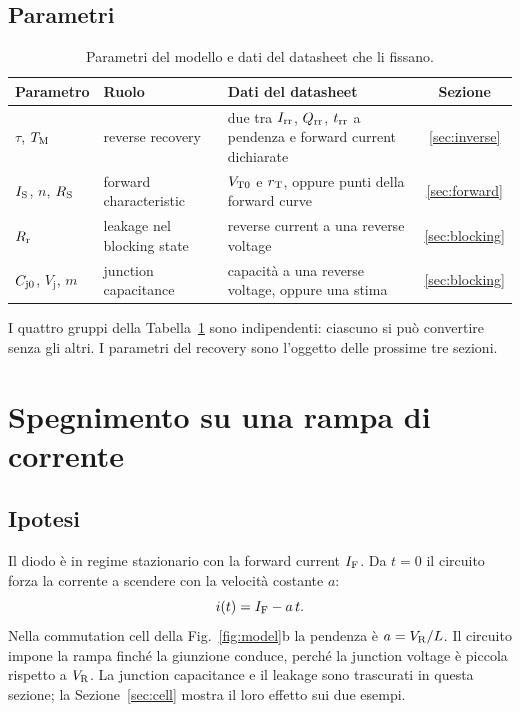 \documentclass[10pt,a4paper]{scrartcl}
\let\newcommand\lmitdefine
\newcommand{\IF}{I_\mathrm{F}}
\newcommand{\VR}{V_\mathrm{R}}
\newcommand{\Irr}{I_\mathrm{rr}}
\newcommand{\Qrr}{Q_\mathrm{rr}}
\newcommand{\trr}{t_\mathrm{rr}}
\newcommand{\TM}{T_\mathrm{M}}
\newcommand{\IS}{I_\mathrm{S}}
\newcommand{\RS}{R_\mathrm{S}}
\newcommand{\Rr}{R_\mathrm{r}}
\newcommand{\VTo}{V_\mathrm{T0}}
\newcommand{\rT}{r_\mathrm{T}}
\newcommand{\Cjo}{C_\mathrm{j0}}
\begin{document}
\subsection{Parametri}
\begin{table}[htb]
\centering\small
\caption{Parametri del modello e dati del datasheet che li fissano.}
\label{tab:params}
\begin{tabular}{@{}llp{6.4cm}c@{}}
\toprule
Parametro & Ruolo & Dati del datasheet & Sezione \\
\midrule
$\tau$, $\TM$ & reverse recovery & due tra $\Irr$, $\Qrr$, $\trr$ a pendenza e forward current dichiarate & \ref{sec:inverse} \\
$\IS$, $n$, $\RS$ & forward characteristic & $\VTo$ e $\rT$, oppure punti della forward curve & \ref{sec:forward} \\
$\Rr$ & leakage nel blocking state & reverse current a una reverse voltage & \ref{sec:blocking} \\
$\Cjo$, $V_\mathrm{j}$, $m$ & junction capacitance & capacità a una reverse voltage, oppure una stima & \ref{sec:blocking} \\
\bottomrule
\end{tabular}
\end{table}
I quattro gruppi della Tabella~\ref{tab:params} sono indipendenti: ciascuno si può convertire senza gli altri. I parametri del recovery sono l'oggetto delle prossime tre sezioni.

\section{Spegnimento su una rampa di corrente}
\label{sec:ramp}
\subsection{Ipotesi}
Il diodo è in regime stazionario con la forward current $\IF$. Da $t = 0$ il circuito forza la corrente a scendere con la velocità costante $a$:
\begin{equation}
i(t) = \IF - a\,t .
\label{eq:ramp}
\end{equation}
Nella commutation cell della Fig.~\ref{fig:model}b la pendenza è $a = \VR/L$. Il circuito impone la rampa finché la giunzione conduce, perché la junction voltage è piccola rispetto a $\VR$. La junction capacitance e il leakage sono trascurati in questa sezione; la Sezione~\ref{sec:cell} mostra il loro effetto sui due esempi.
\end{document}

